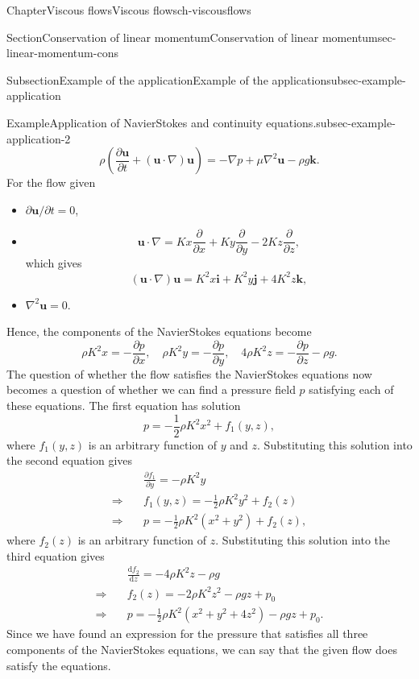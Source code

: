 \documentclass[oneside,10pt,]{book}
\newcommand{\ptxlistdisc}{\raisebox{0.3ex}{\textbullet}}
\numberwithin{equation}{section}
\newcommand{\de}{\mathrm{d}}
\newcommand{\dd}[2]{\frac{\de#1}{\de#2}}
\newcommand{\pd}[2]{\frac{\partial#1}{\partial#2}}
\newcommand{\bu}{\boldsymbol{u}}
\newcommand{\bi}{\boldsymbol{i}}
\newcommand{\bj}{\boldsymbol{j}}
\newcommand{\bk}{\boldsymbol{k}}
\begin{document}
\begin{chapterptx}{Chapter}{Viscous flows}{}{Viscous flows}{}{}{ch-viscousflows}
\begin{sectionptx}{Section}{Conservation of linear momentum}{}{Conservation of linear momentum}{}{}{sec-linear-momentum-cons}
\begin{subsectionptx}{Subsection}{Example of the application}{}{Example of the application}{}{}{subsec-example-application}
\begin{example}{Example}{Application of Navier\textendash{}Stokes and continuity equations.}{subsec-example-application-2}
\begin{equation*}
\rho\left(\pd{\bu}{t}
+(\bu\cdot\nabla)\bu\right)
=-\nabla p+\mu\nabla^2\bu-\rho g\bk.
\end{equation*}
For the flow given%
\begin{itemize}[label=\ptxlistdisc]
\item{}\(\partial\bu/\partial t=0\),%
\item{}%
\begin{equation*}
\bu\cdot\nabla=Kx\pd{}{x}+Ky\pd{}{y}-2Kz\pd{}{z},
\end{equation*}
which gives%
\begin{equation*}
(\bu\cdot\nabla)\bu=K^2x\bi+K^2y\bj+4K^2z\bk,
\end{equation*}
%
\item{}\(\nabla^2\bu=0\).%
\end{itemize}
Hence, the components of the Navier\textendash{}Stokes equations become%
\begin{equation*}
\rho K^2x=-\pd{p}{x},\quad
\rho K^2y=-\pd{p}{y},\quad
4\rho K^2z=-\pd{p}{z}-\rho g.
\end{equation*}
The question of whether the flow satisfies the Navier\textendash{}Stokes equations now becomes a question of whether we can find a pressure field \(p\) satisfying each of these equations. The first equation has solution%
\begin{equation*}
p=-\frac12\rho K^2x^2+f_1(y,z),
\end{equation*}
where \(f_1(y,z)\) is an arbitrary function of \(y\) and \(z\). Substituting this solution into the second equation gives%
\begin{align*}
&\pd{f_1}{y}=-\rho K^2y\\
\Rightarrow\quad
&f_1(y,z)=-\frac12\rho K^2y^2+f_2(z)\\
\Rightarrow\quad
&p=-\frac12\rho K^2(x^2+y^2)+f_2(z),
\end{align*}
where \(f_2(z)\) is an arbitrary function of \(z\). Substituting this solution into the third equation gives%
\begin{align*}
&\dd{f_2}{z}=-4\rho K^2z-\rho g\\
\Rightarrow\quad
&f_2(z)=-2\rho K^2z^2-\rho gz+p_0\\
\Rightarrow\quad
&p=-\frac12\rho K^2(x^2+y^2+4z^2)-\rho gz+p_0.
\end{align*}
Since we have found an expression for the pressure that satisfies all three components of the Navier\textendash{}Stokes equations, we can say that the given flow does satisfy the equations.%
\end{example}

\end{subsectionptx}
\end{sectionptx}
\end{chapterptx}
\end{document}
